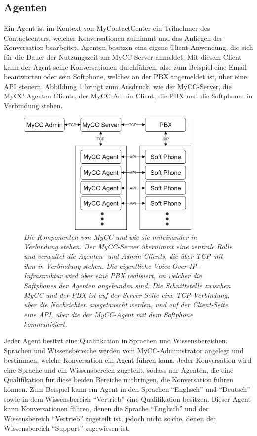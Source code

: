 \subsection{Agenten}
\label{subsec:Agenten}
Ein Agent ist im Kontext von MyContactCenter ein Teilnehmer des Contactcenters, welcher Konversationen aufnimmt und das Anliegen der Konversation bearbeitet. Agenten besitzen eine eigene Client-Anwendung, die sich für die Dauer der Nutzungszeit am MyCC-Server anmeldet.  Mit diesem Client kann der Agent seine Konversationen durchführen, also zum Beispiel eine Email beantworten oder sein Softphone, welches an der PBX angemeldet ist, über eine API steuern. Abbildung \ref{fig:MyCCStructure}  bringt zum Ausdruck, wie der MyCC-Server, die MyCC-Agenten-Clients, der MyCC-Admin-Client, die PBX und die Softphones in Verbindung stehen.
\begin{figure} %
	\centering
		\includegraphics[width=0.8\textwidth]{img/MyCCStructure.png}
	\caption[Komponentenstruktur von MyContactCenter]{\textit{Die Komponenten von MyCC und wie sie miteinander in Verbindung stehen. Der MyCC-Server übernimmt eine zentrale Rolle und verwaltet die Agenten- und Admin-Clients, die über TCP mit ihm in Verbindung stehen. Die eigentliche Voice-Over-IP-Infrastruktur wird über eine PBX realisiert, an welcher die Softphones der Agenten angebunden sind. Die Schnittstelle zwischen MyCC und der PBX ist auf der Server-Seite eine TCP-Verbindung, über die Nachrichten ausgetauscht werden, und auf der Client-Seite eine API, über die der MyCC-Agent mit dem Softphone kommuniziert.}}
	\label{fig:MyCCStructure}
\end{figure}
Jeder Agent besitzt eine Qualifikation in Sprachen und Wissensbereichen. Sprachen und Wissensbereiche werden vom MyCC-Administrator angelegt und bestimmen, welche Konversation ein Agent führen kann. Jeder Konversation wird eine Sprache und ein Wissensbereich zugeteilt, sodass nur Agenten, die eine Qualifikation für diese beiden Bereiche mitbringen, die Konversation führen können. Zum Beispiel kann ein Agent in den Sprachen ``Englisch'' und ``Deutsch'' sowie in dem Wissensbereich ``Vertrieb'' eine Qualifikation besitzen. Dieser Agent kann Konversationen führen, denen die Sprache ``Englisch'' und der Wissensbereich ``Vertrieb'' zugeteilt ist, jedoch nicht solche, denen der Wissensbereich ``Support'' zugewiesen ist.

